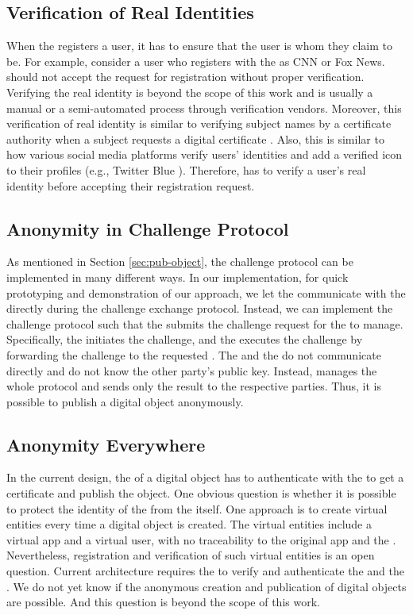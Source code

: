 \subsection{Verification of Real Identities}
When the \ta registers a user, it has to ensure that the user is whom they claim to be. For example, consider a user who registers with the \ta as CNN or Fox News. \ta should not accept the request for registration without proper verification. Verifying the real identity is beyond the scope of this work and is usually a manual or a semi-automated process through verification vendors. Moreover, this verification of real identity is similar to verifying subject names by a certificate authority when a subject requests a digital certificate \cite{ca-validation}. Also, this is similar to how various social media platforms verify users' identities and add a verified icon to their profiles (e.g., Twitter Blue \cite{twitter-blue}). Therefore, \ta has to verify a user's real identity before accepting their registration request. 

\subsection{Anonymity in Challenge Protocol}
\label{sec:anon-challenge}
As mentioned in Section \ref{sec:pub-object}, the challenge protocol can be implemented in many different ways. In our implementation, for quick prototyping and demonstration of our approach, we let the \owner communicate with the \publisher directly during the challenge exchange protocol. Instead, we can implement the challenge protocol such that the \owner submits the challenge request for the \ta to manage. Specifically, the \owner initiates the challenge, and the \ta executes the challenge by forwarding the challenge to the requested \publisher. The \owner and the \publisher do not communicate directly and do not know the other party's public key. Instead, \ta manages the whole protocol and sends only the result to the respective parties. Thus, it is possible to publish a digital object anonymously. 

\subsection{Anonymity Everywhere}
In the current design, the \owner of a digital object has to authenticate with the \ta to get a certificate and publish the object. One obvious question is whether it is possible to protect the identity of the \owner from the \ta itself. One approach is to create virtual entities every time a digital object is created. The virtual entities include a virtual app and a virtual user, with no traceability to the original app and the \owner.
Nevertheless, registration and verification of such virtual entities is an open question. Current architecture requires the \ta to verify and authenticate the \app and the \owner. We do not yet know if the anonymous creation and publication of digital objects are possible. And this question is beyond the scope of this work. 


